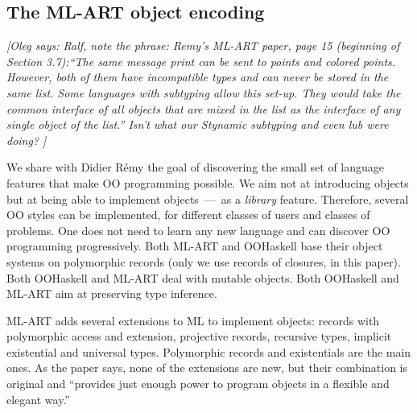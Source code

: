 \documentclass{jfp}
\newcommand{\oleg}[1]{{\it [Oleg says: #1]}}
\newcommand{\HList}{\textsc{HList}}
\begin{document}
\subsection{The ML-ART object encoding}
\label{S:MLART}

\oleg{Ralf, note the phrase: Remy's ML-ART paper, page 15
(beginning of Section 3.7):``The same message print can be sent to
  points and colored points. However, both of them have incompatible
  types and can never be stored in the same list. Some languages with
  subtyping allow this set-up. They would take the common interface
  of all objects that are mixed in the list as the interface of any
  single object of the list.''
  Isn't what our Stynamic subtyping and even lub were doing?
}

We share with Didier R{\'e}my the goal of discovering the small set of
language features that make OO programming possible. We aim not at
introducing objects but at being able to implement objects~---~as a
\emph{library} feature. Therefore, several OO styles can be
implemented, for different classes of users and classes of
problems. One does not need to learn any new language and can discover
OO programming progressively. Both {ML-ART} and OOHaskell base their object
systems on polymorphic records (only we use records of closures, in
this paper). Both OOHaskell and {ML-ART} deal with mutable objects.
Both OOHaskell and {ML-ART} aim at preserving type inference.

ML-ART adds several extensions to ML to implement objects: records
with polymorphic access and extension, projective records, recursive
types, implicit existential and universal types. Polymorphic records
and existentials are the main ones. As the paper \cite{ML-ART} says,
none of the extensions are new, but their combination is original and
``provides just enough power to program objects in a flexible and
elegant way.''

\end{document}

